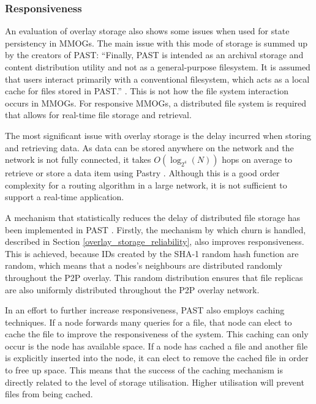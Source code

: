 \documentclass[10pt,a4paper,journal,cspaper,compsoc]{IEEEtran}
\begin{document}
\subsubsection{Responsiveness}
An evaluation of overlay storage also shows some issues when used for state persistency in MMOGs. The main issue with this mode of storage is summed
up by the creators of PAST: ``Finally, PAST is intended as an archival storage and content distribution utility and not as a general-purpose
filesystem. It is assumed that users interact primarily with a conventional filesystem, which acts as a local cache for files stored in PAST.''
\cite{storage_and_chaching_PAST}. This is not how the file system interaction occurs in MMOGs. For responsive MMOGs, a distributed file system is
required that allows for real-time file storage and retrieval.

The most significant issue with overlay storage is the delay incurred when storing and retrieving data. As data can be stored anywhere on the network
and the network is not fully connected, it takes $O(\log_{2^4}(N))$ hops on average to retrieve or store a data item using Pastry
\cite{storage_and_chaching_PAST}. Although this is a good order complexity for a routing algorithm in a large network, it is not sufficient to
support a real-time application.

A mechanism that statistically reduces the delay of distributed file storage has been implemented in PAST \cite{storage_and_chaching_PAST}. Firstly,
the mechanism by which churn is handled, described in Section \ref{overlay_storage_reliability}, also improves responsiveness.  This is achieved,
because IDs created by the SHA-1 random hash function are random, which means that a nodes's neighbours are distributed randomly throughout the P2P
overlay. This random distribution ensures that file replicas are also uniformly distributed throughout the P2P overlay network.

In an effort to further increase responsiveness, PAST also employs caching techniques. If a node forwards many queries for a file, that node can
elect to cache the file to improve the responsiveness of the system. This caching can only occur is the node has available space. If a node has
cached a file and another file is explicitly inserted into the node, it can elect to remove the cached file in order to free up space. This means
that the success of the caching mechanism is directly related to the level of storage utilisation. Higher utilisation will prevent files from being
cached.
\end{document}
